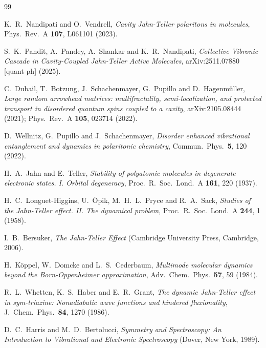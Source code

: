 \documentclass[12pt,a4paper]{article}
\begin{document}
\small
\begin{thebibliography}{99}
\setlength{\itemsep}{0pt}\setlength{\parskip}{0pt}

K.~R.~Nandipati and O.~Vendrell,
\textit{Cavity Jahn-Teller polaritons in molecules},
Phys.\ Rev.\ A \textbf{107}, L061101 (2023).

S.~K.~Pandit, A.~Pandey, A.~Shankar and K.~R.~Nandipati,
\textit{Collective Vibronic Cascade in Cavity-Coupled Jahn-Teller Active
Molecules}, arXiv:2511.07880 [quant-ph] (2025).

C.~Dubail, T.~Botzung, J.~Schachenmayer, G.~Pupillo and D.~Hagenm\"uller,
\textit{Large random arrowhead matrices: multifractality, semi-localization,
and protected transport in disordered quantum spins coupled to a cavity},
arXiv:2105.08444 (2021); Phys.\ Rev.\ A \textbf{105}, 023714 (2022).

D.~Wellnitz, G.~Pupillo and J.~Schachenmayer,
\textit{Disorder enhanced vibrational entanglement and dynamics in
polaritonic chemistry},
Commun.\ Phys.\ \textbf{5}, 120 (2022).

H.~A.~Jahn and E.~Teller,
\textit{Stability of polyatomic molecules in degenerate electronic states.
I. Orbital degeneracy},
Proc.\ R.\ Soc.\ Lond.\ A \textbf{161}, 220 (1937).

H.~C.~Longuet-Higgins, U.~\"Opik, M.~H.~L.~Pryce and R.~A.~Sack,
\textit{Studies of the Jahn-Teller effect. II. The dynamical problem},
Proc.\ R.\ Soc.\ Lond.\ A \textbf{244}, 1 (1958).

I.~B.~Bersuker,
\textit{The Jahn-Teller Effect} (Cambridge University Press, Cambridge, 2006).

H.~K\"oppel, W.~Domcke and L.~S.~Cederbaum,
\textit{Multimode molecular dynamics beyond the Born-Oppenheimer
approximation},
Adv.\ Chem.\ Phys.\ \textbf{57}, 59 (1984).

R.~L.~Whetten, K.~S.~Haber and E.~R.~Grant,
\textit{The dynamic Jahn-Teller effect in sym-triazine: Nonadiabatic wave
functions and hindered fluxionality},
J.\ Chem.\ Phys.\ \textbf{84}, 1270 (1986).

D.~C.~Harris and M.~D.~Bertolucci,
\textit{Symmetry and Spectroscopy: An Introduction to Vibrational and
Electronic Spectroscopy} (Dover, New York, 1989).


\end{thebibliography}
\end{document}
